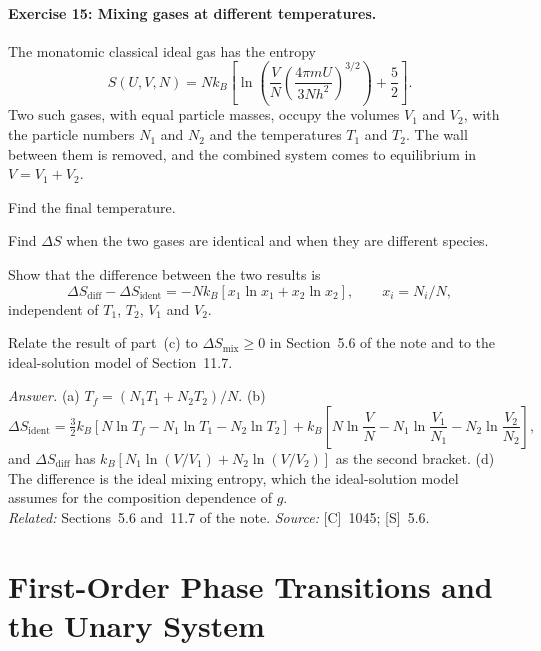 \documentclass[11pt]{article}      %
\numberwithin{equation}{section}   %
\begin{document}
\paragraph{Exercise 15: Mixing gases at different temperatures.}
The monatomic classical ideal gas has the entropy
\begin{equation*}
    S(U, V, N) = Nk_B\left[\ln\!\left(\frac{V}{N}\left(\frac{4\pi mU}{3Nh^2}\right)^{3/2}\right) + \frac52\right].
\end{equation*}
Two such gases, with equal particle masses, occupy the volumes $V_1$ and $V_2$, with the particle numbers $N_1$ and $N_2$ and the temperatures $T_1$ and $T_2$. The wall between them is removed, and the combined system comes to equilibrium in $V = V_1 + V_2$.
\begin{parts}
    \item Find the final temperature.
    \item Find $\Delta S$ when the two gases are identical and when they are different species.
    \item Show that the difference between the two results is
    \begin{equation*}
        \Delta S_{\text{diff}} - \Delta S_{\text{ident}} = -Nk_B\left[x_1\ln x_1 + x_2\ln x_2\right],
        \qquad x_i = N_i/N,
    \end{equation*}
    independent of $T_1$, $T_2$, $V_1$ and $V_2$.
    \item Relate the result of part~(c) to $\Delta S_{\text{mix}} \ge 0$ in Section~5.6 of the note and to the ideal-solution model of Section~11.7.
\end{parts}
\textit{Answer.} (a) $T_f = (N_1T_1 + N_2T_2)/N$. (b)
\begin{equation*}
    \Delta S_{\text{ident}} = \tfrac32k_B\left[N\ln T_f - N_1\ln T_1 - N_2\ln T_2\right] + k_B\left[N\ln\frac{V}{N} - N_1\ln\frac{V_1}{N_1} - N_2\ln\frac{V_2}{N_2}\right],
\end{equation*}
and $\Delta S_{\text{diff}}$ has $k_B[N_1\ln(V/V_1) + N_2\ln(V/V_2)]$ as the second bracket. (d) The difference is the ideal mixing entropy, which the ideal-solution model assumes for the composition dependence of $g$.\\
\textit{Related:} Sections~5.6 and~11.7 of the note. \textit{Source:} [C]~1045; [S]~5.6.

\section{First-Order Phase Transitions and the Unary System}
\end{document}
